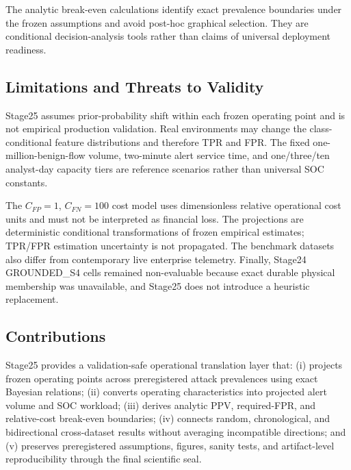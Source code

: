 The analytic break-even calculations identify exact prevalence
boundaries under the frozen assumptions and avoid post-hoc graphical
selection. They are conditional decision-analysis tools rather than
claims of universal deployment readiness.

\subsection{Limitations and Threats to Validity}

Stage25 assumes prior-probability shift within each frozen operating
point and is not empirical production validation. Real environments may
change the class-conditional feature distributions and therefore TPR and
FPR. The fixed one-million-benign-flow volume, two-minute alert service
time, and one/three/ten analyst-day capacity tiers are reference
scenarios rather than universal SOC constants.

The $C_{FP}=1$, $C_{FN}=100$ cost model uses dimensionless relative
operational cost units and must not be interpreted as financial loss.
The projections are deterministic conditional transformations of frozen
empirical estimates; TPR/FPR estimation uncertainty is not propagated.
The benchmark datasets also differ from contemporary live enterprise
telemetry. Finally, Stage24 GROUNDED\_S4 cells remained non-evaluable
because exact durable physical membership was unavailable, and Stage25
does not introduce a heuristic replacement.

\subsection{Contributions}

Stage25 provides a validation-safe operational translation layer that:
(i) projects frozen operating points across preregistered attack
prevalences using exact Bayesian relations; (ii) converts operating
characteristics into projected alert volume and SOC workload;
(iii) derives analytic PPV, required-FPR, and relative-cost break-even
boundaries; (iv) connects random, chronological, and bidirectional
cross-dataset results without averaging incompatible directions; and
(v) preserves preregistered assumptions, figures, sanity tests, and
artifact-level reproducibility through the final scientific seal.
